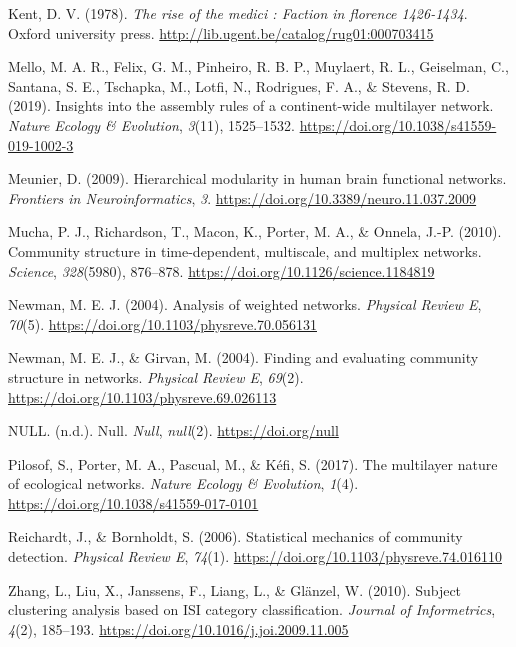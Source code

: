 \documentclass[
  12pt,
]{article}
\begin{document}
\leavevmode\hypertarget{ref-Kent1978}{}%
Kent, D. V. (1978). \emph{The rise of the medici : Faction in florence
1426-1434}. Oxford university press.
\url{http://lib.ugent.be/catalog/rug01:000703415}

\leavevmode\hypertarget{ref-Mello2019}{}%
Mello, M. A. R., Felix, G. M., Pinheiro, R. B. P., Muylaert, R. L.,
Geiselman, C., Santana, S. E., Tschapka, M., Lotfi, N., Rodrigues, F.
A., \& Stevens, R. D. (2019). Insights into the assembly rules of a
continent-wide multilayer network. \emph{Nature Ecology \& Evolution},
\emph{3}(11), 1525--1532.
\url{https://doi.org/10.1038/s41559-019-1002-3}

\leavevmode\hypertarget{ref-Meunier2009}{}%
Meunier, D. (2009). Hierarchical modularity in human brain functional
networks. \emph{Frontiers in Neuroinformatics}, \emph{3}.
\url{https://doi.org/10.3389/neuro.11.037.2009}

\leavevmode\hypertarget{ref-Mucha2010}{}%
Mucha, P. J., Richardson, T., Macon, K., Porter, M. A., \& Onnela, J.-P.
(2010). Community structure in time-dependent, multiscale, and multiplex
networks. \emph{Science}, \emph{328}(5980), 876--878.
\url{https://doi.org/10.1126/science.1184819}

\leavevmode\hypertarget{ref-Newman2004b}{}%
Newman, M. E. J. (2004). Analysis of weighted networks. \emph{Physical
Review E}, \emph{70}(5).
\url{https://doi.org/10.1103/physreve.70.056131}

\leavevmode\hypertarget{ref-Newman2004a}{}%
Newman, M. E. J., \& Girvan, M. (2004). Finding and evaluating community
structure in networks. \emph{Physical Review E}, \emph{69}(2).
\url{https://doi.org/10.1103/physreve.69.026113}

\leavevmode\hypertarget{ref-null}{}%
NULL. (n.d.). Null. \emph{Null}, \emph{null}(2).
\url{https://doi.org/null}

\leavevmode\hypertarget{ref-Pilosof2017}{}%
Pilosof, S., Porter, M. A., Pascual, M., \& Kéfi, S. (2017). The
multilayer nature of ecological networks. \emph{Nature Ecology \&
Evolution}, \emph{1}(4). \url{https://doi.org/10.1038/s41559-017-0101}

\leavevmode\hypertarget{ref-Reichardt2006}{}%
Reichardt, J., \& Bornholdt, S. (2006). Statistical mechanics of
community detection. \emph{Physical Review E}, \emph{74}(1).
\url{https://doi.org/10.1103/physreve.74.016110}

\leavevmode\hypertarget{ref-Zhang2010}{}%
Zhang, L., Liu, X., Janssens, F., Liang, L., \& Glänzel, W. (2010).
Subject clustering analysis based on ISI category classification.
\emph{Journal of Informetrics}, \emph{4}(2), 185--193.
\url{https://doi.org/10.1016/j.joi.2009.11.005}
\end{document}
